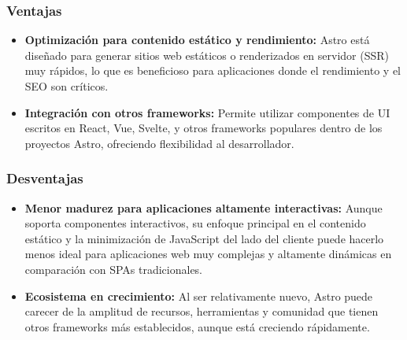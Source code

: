 \subsubsection{Ventajas}
\begin{itemize}
\item \textbf{Optimización para contenido estático y rendimiento:} Astro está diseñado para generar sitios web estáticos o renderizados en servidor (SSR) muy rápidos, lo que es beneficioso para aplicaciones donde el rendimiento y el SEO son críticos.
\item \textbf{Integración con otros frameworks:} Permite utilizar componentes de UI escritos en React, Vue, Svelte, y otros frameworks populares dentro de los proyectos Astro, ofreciendo flexibilidad al desarrollador.
\end{itemize}

\subsubsection{Desventajas}
\begin{itemize}
\item \textbf{Menor madurez para aplicaciones altamente interactivas:} Aunque soporta componentes interactivos, su enfoque principal en el contenido estático y la minimización de JavaScript del lado del cliente puede hacerlo menos ideal para aplicaciones web muy complejas y altamente dinámicas en comparación con SPAs tradicionales.
\item \textbf{Ecosistema en crecimiento:} Al ser relativamente nuevo, Astro puede carecer de la amplitud de recursos, herramientas y comunidad que tienen otros frameworks más establecidos, aunque está creciendo rápidamente.
\end{itemize}